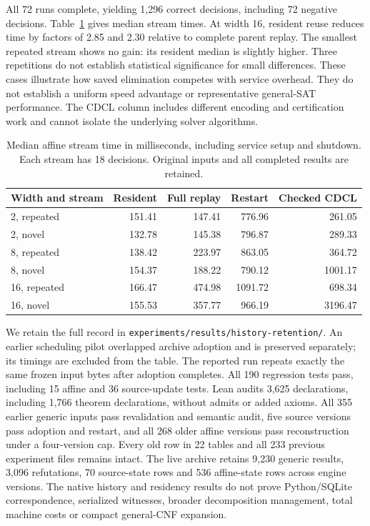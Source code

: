 \documentclass[11pt,a4paper]{article}
\numberwithin{equation}{section}
\theoremstyle{plain}
\theoremstyle{definition}
\theoremstyle{remark}
\begin{document}
All 72 runs complete, yielding 1,296 correct decisions, including 72 negative decisions. Table~\ref{tab:affine-residency} gives median stream times. At width 16, resident reuse reduces time by factors of 2.85 and 2.30 relative to complete parent replay. The smallest repeated stream shows no gain: its resident median is slightly higher. Three repetitions do not establish statistical significance for small differences. These cases illustrate how saved elimination competes with service overhead. They do not establish a uniform speed advantage or representative general-SAT performance. The CDCL column includes different encoding and certification work and cannot isolate the underlying solver algorithms.

\begin{table}[t]
\centering
\small
\caption{Median affine stream time in milliseconds, including service setup and shutdown. Each stream has 18 decisions. Original inputs and all completed results are retained.}
\label{tab:affine-residency}
\begin{tabular}{lrrrr}
\toprule
Width and stream & Resident & Full replay & Restart & Checked CDCL\\
\midrule
2, repeated & 151.41 & 147.41 & 776.96 & 261.05\\
2, novel & 132.78 & 145.38 & 796.87 & 289.33\\
8, repeated & 138.42 & 223.97 & 863.05 & 364.72\\
8, novel & 154.37 & 188.22 & 790.12 & 1001.17\\
16, repeated & 166.47 & 474.98 & 1091.72 & 698.34\\
16, novel & 155.53 & 357.77 & 966.19 & 3196.47\\
\bottomrule
\end{tabular}
\end{table}

We retain the full record in \texttt{experiments/results/history-retention/}. An earlier scheduling pilot overlapped archive adoption and is preserved separately; its timings are excluded from the table. The reported run repeats exactly the same frozen input bytes after adoption completes. All 190 regression tests pass, including 15 affine and 36 source-update tests. Lean audits 3,625 declarations, including 1,766 theorem declarations, without admits or added axioms. All 355 earlier generic inputs pass revalidation and semantic audit, five source versions pass adoption and restart, and all 268 older affine versions pass reconstruction under a four-version cap. Every old row in 22 tables and all 233 previous experiment files remains intact. The live archive retains 9,230 generic results, 3,096 refutations, 70 source-state rows and 536 affine-state rows across engine versions. The native history and residency results do not prove Python/SQLite correspondence, serialized witnesses, broader decomposition management, total machine costs or compact general-CNF expansion.
\end{document}
